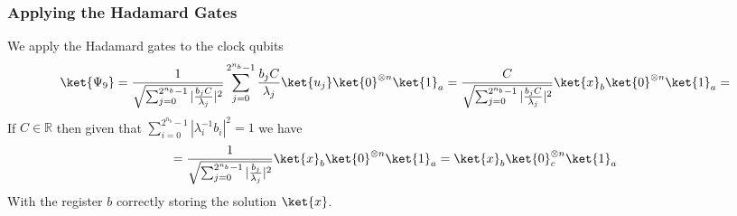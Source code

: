 \documentclass[10pt]{article}
\begin{document}
\subsubsection{Applying the Hadamard Gates}
We apply the Hadamard gates to the clock qubits
$$\ket{\Psi_9} = \frac{1}{\sqrt{\sum_{j=0}^{2^{n_b}-1}|\frac{b_jC}{\lambda_j}|^2}}\sum_{j=0}^{2^{n_b}-1}\frac{b_jC}{\lambda_j}\ket{u_j}\ket{0}^{\otimes n}\ket{1}_a =\frac{C}{\sqrt{\sum_{j=0}^{2^{n_b}-1}|\frac{b_jC}{\lambda_j}|^2}}\ket{x}_b\ket{0}^{\otimes n}\ket{1}_a=$$
If $C\in\mathbb{R}$ then given that $\sum_{i=0}^{2^{n_b}-1}|\lambda_i^{-1}b_i|^2=1$ we have
$$=\frac{1}{\sqrt{\sum_{j=0}^{2^{n_b}-1}|\frac{b_j}{\lambda_j}|^2}}\ket{x}_b\ket{0}^{\otimes n}\ket{1}_a=\ket{x}_b\ket{0}_c^{\otimes n}\ket{1}_a$$
With the register $b$ correctly storing the solution $\ket{x}$.

\nocite{Harrow_2009}
\nocite{https://doi.org/10.48550/arxiv.2108.09004}
\nocite{qiskit}
\renewcommand\refname{References}


\end{document}
